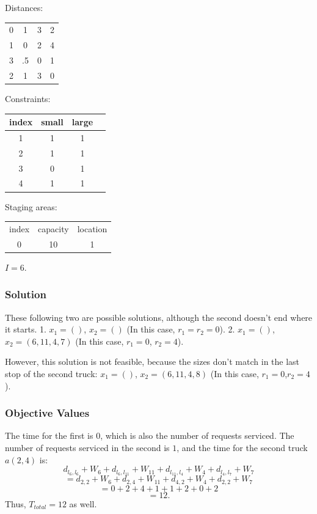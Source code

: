 \documentclass{article}
\begin{document}
Distances:

\begin{tabular} { c c c c }
0  & 1  & 3 & 2 \\
1  & 0  & 2 & 4 \\
3  & .5 & 0 & 1 \\
2  & 1  & 3 & 0 \\
\end{tabular}

Constraints:

\begin{tabular} {c | c   c   c }
index     &    small   &   large \\
\hline
  1       &    1       &      1 \\
  2       &    1       &      1 \\
  3       &    0       &      1 \\
  4       &    1       &      1 \\
\end{tabular}

Staging areas:

\begin{tabular} {c c c }
index     &   capacity & location \\
 0        &     10     &    1     \\
\end{tabular}

$I = 6$.


\subsubsection{Solution}

These following two are possible solutions, although the second doesn't end where it starts.
1. $x_1 = ()$, $x_2 = ()$ (In this case, $r_1 = r_2 = 0$).
2. $x_1 = ()$, $x_2 = (6, 11, 4, 7)$ (In this case, $r_1 = 0$, $r_2 = 4$).

However, this solution is not feasible, because the sizes don't match in the last stop of the second truck:
$x_1 = ()$, $x_2 = (6, 11, 4, 8)$ (In this case, $r_1 = 0$,$ r_2 = 4$).

\subsubsection{Objective Values}

The time for the first is $0$, which is also the number of requests serviced.
The number of requests serviced in the second is $1$, and the time for the second truck $a(2, 4)$ is:
$$d_{l_6,l_6} + W_6 + d_{l_6,l_{11}} + W_{11} + d_{l_{11}, l_4} + W_{4} + d_{l_4,l_7} + W_7$$
$$ = d_{2,2} + W_6 + d_{2,4} + W_{11} + d_{4, 2} + W_{4} + d_{2,2} + W_7$$
$$ = 0 + 2 + 4 + 1 + 1 + 2 + 0 + 2 $$
$$ = 12. $$
Thus, $T_{total} = 12$ as well.
\end{document}

